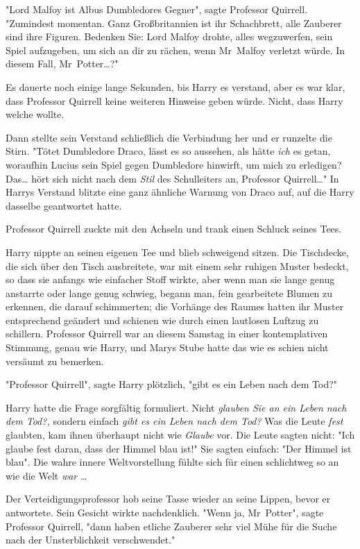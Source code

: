 {"Lord Malfoy ist Albus Dumbledores Gegner", sagte Professor Quirrell. "Zumindest momentan. Ganz Großbritannien ist ihr Schachbrett, alle Zauberer sind ihre Figuren. Bedenken Sie: Lord Malfoy drohte, alles wegzuwerfen, sein Spiel aufzugeben, um sich an dir zu rächen, wenn Mr~Malfoy verletzt würde. In diesem Fall, Mr~Potter…?"

Es dauerte noch einige lange Sekunden, bis Harry es verstand, aber es war klar, dass Professor Quirrell keine weiteren Hinweise geben würde. Nicht, dass Harry welche wollte.

Dann stellte sein Verstand schließlich die Verbindung her und er runzelte die Stirn. "Tötet Dumbledore Draco, lässt es so aussehen, als hätte \emph{ich} es getan, woraufhin Lucius sein Spiel gegen Dumbledore hinwirft, um mich zu erledigen? Das… hört sich nicht nach dem \emph{Stil} des Schulleiters an, Professor Quirrell…" In Harrys Verstand blitzte eine ganz ähnliche Warnung von Draco auf, auf die Harry dasselbe geantwortet hatte.

Professor Quirrell zuckte mit den Achseln und trank einen Schluck seines Tees.

Harry nippte an seinen eigenen Tee und blieb schweigend sitzen. Die Tischdecke, die sich über den Tisch ausbreitete, war mit einem sehr ruhigen Muster bedeckt, so dass sie anfangs wie einfacher Stoff wirkte, aber wenn man sie lange genug anstarrte oder lange genug schwieg, begann man, fein gearbeitete Blumen zu erkennen, die darauf schimmerten; die Vorhänge des Raumes hatten ihr Muster entsprechend geändert und schienen wie durch einen lautlosen Luftzug zu schillern. Professor Quirrell war an diesem Samstag in einer kontemplativen Stimmung, genau wie Harry, und Marys Stube hatte das wie es schien nicht versäumt zu bemerken.

"Professor Quirrell", sagte Harry plötzlich, "gibt es ein Leben nach dem Tod?"

Harry hatte die Frage sorgfältig formuliert. Nicht \emph{glauben Sie an ein Leben nach dem} \emph{Tod?,} sondern einfach \emph{gibt es ein Leben nach dem Tod?} Was die Leute \emph{fest} glaubten, kam ihnen überhaupt nicht wie \emph{Glaube} vor. Die Leute sagten nicht: "Ich glaube fest daran, dass der Himmel blau ist!" Sie sagten einfach: "Der Himmel ist blau". Die wahre innere Weltvorstellung fühlte sich für einen schlichtweg so an wie die Welt \emph{war} …

Der Verteidigungsprofessor hob seine Tasse wieder an seine Lippen, bevor er antwortete. Sein Gesicht wirkte nachdenklich. "Wenn ja, Mr~Potter", sagte Professor Quirrell, "dann haben etliche Zauberer sehr viel Mühe für die Suche nach der Unsterblichkeit verschwendet."

}
